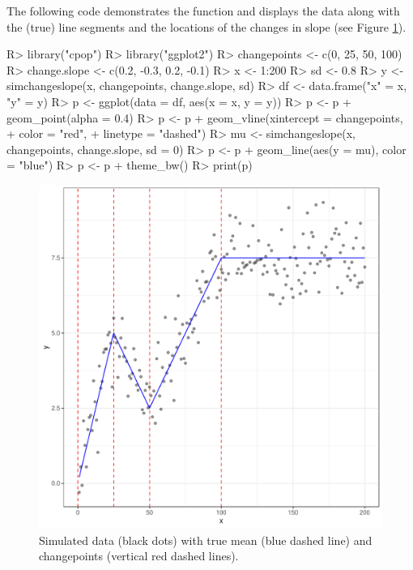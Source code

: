 \documentclass[article]{jss}
\begin{document}
The following code demonstrates the  function and displays the data along with the (true) line segments and the locations of the changes in slope (see Figure \ref{fig:simulate-example}).
\begin{CodeChunk}
\begin{CodeInput}
R> library("cpop")
R> library("ggplot2")
R> changepoints <- c(0, 25, 50, 100)
R> change.slope <- c(0.2, -0.3, 0.2, -0.1)
R> x <- 1:200
R> sd <- 0.8
R> y <- simchangeslope(x, changepoints, change.slope, sd)
R> df <- data.frame("x" = x, "y" = y)
R> p <- ggplot(data = df, aes(x = x, y = y))
R> p <- p + geom_point(alpha = 0.4)
R> p <- p + geom_vline(xintercept = changepoints,
+                      color = "red",
+                      linetype = "dashed")
R> mu <- simchangeslope(x, changepoints, change.slope, sd = 0)
R> p <- p + geom_line(aes(y = mu), color = "blue")
R> p <- p + theme_bw()
R> print(p)
\end{CodeInput}
\end{CodeChunk}
%
%
\begin{figure}
\centering
\includegraphics[width=0.6\linewidth]{figures/simulate_example_ggplot.pdf}
\caption{Simulated data (black dots) with true mean (blue dashed line) and changepoints (vertical red dashed lines).}
\label{fig:simulate-example}
\end{figure}
%
%
\end{document}
